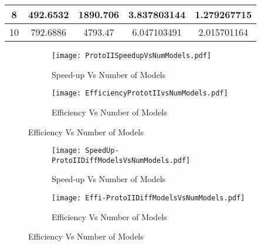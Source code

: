\begin{table}[]
\begin{tabular}{|c|c|c|c|c|}
8                                                                                                                            & 492.6532                                                                                                                                              & 1890.706                                                                                                              & 3.837803144       & 1.279267715                 \\ \hline
10                                                                                                                           & 792.6886                                                                                                                                              & 4793.47                                                                                                               & 6.047103491       & 2.015701164                 \\ \hline
\end{tabular}
\end{table}

\begin{figure}
\centering
\captionsetup[subfigure]{labelformat=empty}
\begin{subfigure}
\centering
\texttt{[image: ProtoIISpeedupVsNumModels.pdf]}
\caption{Speed-up Vs Number of Models}
\label{fig:ProtoIISpeedupVsNumModels}
\end{subfigure}
\begin{subfigure}
\centering
\texttt{[image: EfficiencyPrototIIvsNumModels.pdf]}
\caption{Efficiency Vs Number of Models}
\label{EfficiencyPrototIIvsNumModels}
\end{subfigure}
\end{figure}


\begin{figure}
\centering
\captionsetup[subfigure]{labelformat=empty}
\begin{subfigure}
\centering
\texttt{[image: SpeedUp-ProtoIIDiffModelsVsNumModels.pdf]}
\caption{Speed-up Vs Number of Models}
\label{fig:SpeedUp-ProtoIIDiffModelsVsNumModels}
\end{subfigure}
\begin{subfigure}
\centering
\texttt{[image: Effi-ProtoIIDiffModelsVsNumModels.pdf]}
\caption{Efficiency Vs Number of Models}
\label{Effi-ProtoIIDiffModelsVsNumModels}
\end{subfigure}
\end{figure}


